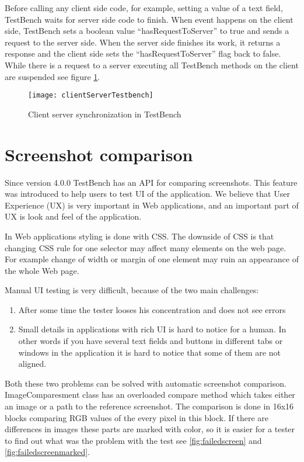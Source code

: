 Before calling any client side code, for example, setting a value of a
text field, TestBench waits for server side code to finish. When event happens
on the client side, TestBench sets a boolean value ``hasRequestToServer'' to
true and sends a request to the server side. When the server side finishes its
work, it returns a response and the client side sets the ``hasRequestToServer''
flag back to false. While there is a request to a server executing all TestBench
methods on the client are suspended see figure \ref{fig:clientServerTestbench}.  
	\begin{figure}
	\centering
	\texttt{[image: clientServerTestbench]}
	\caption{Client server synchronization in TestBench}
	\label{fig:clientServerTestbench}
	\end{figure}

\section{Screenshot comparison}
\label{sec:screencompare}
Since version 4.0.0 TestBench has an API for comparing screenshots. This 
feature was introduced to help users to test UI of the application. We believe
that User Experience (UX) is very important in Web applications, and an
important part of UX is look and feel of the application.

In Web applications styling is done with CSS. The downside of CSS 
is that changing CSS rule for one selector may affect many elements on the
web page. For example change of width or margin of one element may ruin an
appearance of the whole Web page.

Manual UI testing is very difficult, because of the two main challenges:
\begin{enumerate}
  \item After some time the tester looses his concentration and does not see
  errors
  \item Small details in applications with rich UI is hard to notice for a
  human. In other words if you have several text fields and buttons in different
  tabs or windows in the application it is hard to notice that some of them are
  not aligned.
\end{enumerate}

Both these two problems can be solved with automatic screenshot comparison.
ImageComparesment class has an overloaded compare method which takes either an
image or a path to the reference screenshot. The comparison is done in 16x16
blocks comparing RGB values of the every pixel in this block. If there are
differences in images these parts are marked with color, so it is easier for a
tester to find out what was the problem with the test see
\ref{fig:failedscreen} and \ref{fig:failedscreenmarked}.

